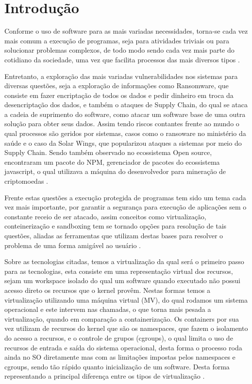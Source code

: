 \chapter{Introdução}
\label{chp:introduction}

Conforme o uso de software para as mais variadas necessidades, torna-se cada vez mais comum a execução de programas, seja para atividades triviais ou para solucionar problemas complexos, de todo modo sendo cada vez mais parte do cotidiano da sociedade, uma vez que facilita processos das mais diversos tipos \cite{bctv}.
 
Entretanto, a exploração das mais variadas vulnerabilidades nos sistemas para diversas questões, seja a exploração de informações como Ransomware, que consiste em fazer encriptação de todos os dados e pedir dinheiro em troca da desencriptação dos dados, e também o ataques de Supply Chain, do qual se ataca a cadeia de suprimento do software, como atacar um software base de uma outra solução para obter seus dados. Assim tendo riscos contantes frente ao mundo o qual processos são geridos por sistemas, casos como o ransoware no ministério da saúde e o caso da Solar Wings, que popularizou ataques a sistemas por meio do Supply Chain. Sendo também observado no ecossistema Open source, encontraram um pacote do NPM, gerenciador de pacotes do ecossistema javascript, o qual utilizava a máquina do desenvolvedor para mineração de criptomoedas \cite{Magalhães_Filho_Marcheri_2022, 10.1007/978-981-13-1274-8_31, 9799263, greenberg2017supply, cpomagazine, aquasec}.

Frente estas questões a execução protegida de programas tem sido um tema cada vez mais importante, por garantir a segurança para execução de aplicações sem o constante receio de ser atacado, assim conceitos como virtualização, conteinerização e sandboxing tem se tornado opções para resolução de tais questões, aliadas as ferramentas que utilizam destas bases para resolver o problema de uma forma amigável ao usuário \cite{10.1145/2884781.2884782, 10.1145/3344341.3368810}.

Sobre as tecnologias citadas, temos a virtualização da qual será o primeiro passo para as tecnologias, esta consiste em uma representação virtual dos recursos, sejam um workspace isolado do qual um software quando executado não possui acesso direto os recursos que o kernel provêm. Nestas formas temos a virtualização utilizando uma máquina virtual (MV), do qual rodamos um sistema operacional e este intervem nas chamadas, o que torna mais pesada a virtualização, quando em comparação a containerização. Os containers por sua vez utilizam de recursos do kernel que são os namespaces, que fazem o isolamento do acesso a recursos, e o controle de grupos (cgroups), o qual limita o uso de recursos de entrada e saída do sistema operacional, desta forma o processo roda ainda no SO diretamente mas com as limitações impostas pelos namespaces e cgroups, sendo tão rápido quanto inicialização de um software. Desta forma representando a principal diferença entre os tipos de virtualização \cite{kernelscheepers, secrypt22}.


